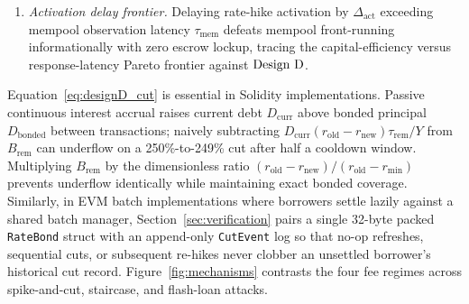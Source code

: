 \begin{theorem}
\begin{enumerate}[label=(\roman*), leftmargin=2.2em, itemsep=2pt]
Under these rules, $\DesignD$ preserves its coverage invariant without underflow under continuous interest compounding, defeats all six attack vectors (unbonded high-rate opening, pre-aged micro-hike clock manipulation, cut-then-re-hike cycles, post-cut vesting mismatches, batch-transition griefing, and dormant low-debt shield vaults topped up via \texttt{withdrawBold}) with
\begin{equation}\label{eq:designD_dom}
\mathrm{Cost}_{\mathrm{attack}} \ge D r_{\mathrm{high}}\frac{P}{Y} + \Phi_{\mathrm{open}} + f_{\mathrm{flash}} D + g_{\mathrm{tx}} \ge D r_{\mathrm{high}}\frac{P}{Y},
\end{equation}
incurs zero forfeiture on honest $P$-day holds, and preserves fixed-debt upward staircase path invariance and degree-one debt homogeneity.
\item \emph{Activation delay frontier.} Delaying rate-hike activation by $\Delta_{\mathrm{act}}$ exceeding mempool observation latency $\tau_{\mathrm{mem}}$ defeats mempool front-running informationally with zero escrow lockup, tracing the capital-efficiency versus response-latency Pareto frontier against $\DesignD$.
\end{enumerate}
\end{theorem}

Equation~\eqref{eq:designD_cut} is essential in Solidity implementations. Passive continuous interest accrual raises current debt $D_{\mathrm{curr}}$ above bonded principal $D_{\mathrm{bonded}}$ between transactions; naively subtracting $D_{\mathrm{curr}}(r_{\mathrm{old}} - r_{\mathrm{new}})\tau_{\mathrm{rem}}/Y$ from $B_{\mathrm{rem}}$ can underflow on a 250\%-to-249\% cut after half a cooldown window. Multiplying $B_{\mathrm{rem}}$ by the dimensionless ratio $(r_{\mathrm{old}} - r_{\mathrm{new}})/(r_{\mathrm{old}} - r_{\min})$ prevents underflow identically while maintaining exact bonded coverage. Similarly, in EVM batch implementations where borrowers settle lazily against a shared batch manager, Section~\ref{sec:verification} pairs a single 32-byte packed \texttt{RateBond} struct with an append-only \texttt{CutEvent} log so that no-op refreshes, sequential cuts, or subsequent re-hikes never clobber an unsettled borrower's historical cut record. Figure~\ref{fig:mechanisms} contrasts the four fee regimes across spike-and-cut, staircase, and flash-loan attacks.

